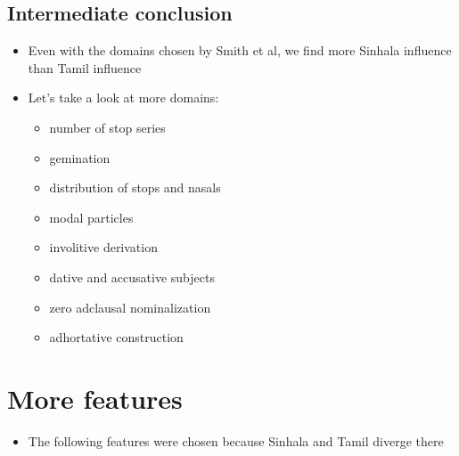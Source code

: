 \documentclass[a4paper,12pt]{article}
\begin{document}
%

\subsection{Intermediate conclusion}
\begin{itemize}
 \item Even with the domains chosen by Smith et al, we find more Sinhala influence than Tamil influence
 \item Let's take a look at more domains:
	\begin{itemize}
	 \item number of stop series
	 \item gemination
	 \item distribution of stops and nasals
	 \item modal particles
	 \item involitive derivation
	 \item dative and accusative subjects
	 \item zero adclausal nominalization
 	 \item adhortative construction
	\end{itemize}
\end{itemize}




\section{More features}
\begin{itemize}
 \item The following features were chosen because Sinhala and Tamil diverge there
\end{itemize}
\end{document}
